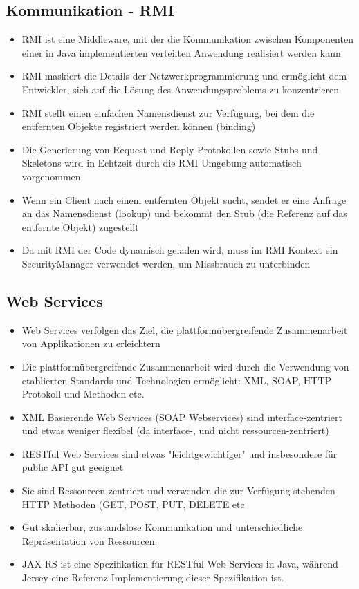 \documentclass[a4paper]{article}
\begin{document}
		\newpage
		\subsection{Kommunikation - RMI}
		
			\begin{itemize}
				\item RMI ist eine Middleware, mit der die Kommunikation zwischen Komponenten einer in Java implementierten verteilten Anwendung realisiert werden kann
				\item RMI maskiert die Details der Netzwerkprogrammierung und ermöglicht dem Entwickler, sich auf die Lösung des Anwendungsproblems zu konzentrieren
				\item RMI stellt einen einfachen Namensdienst zur Verfügung, bei dem die entfernten Objekte registriert werden können (binding)
				\item Die Generierung von Request und Reply Protokollen sowie Stubs und Skeletons wird in Echtzeit durch die RMI Umgebung automatisch vorgenommen
				\item Wenn ein Client nach einem entfernten Objekt sucht, sendet er eine Anfrage an das Namensdienst (lookup) und bekommt den Stub (die Referenz auf das entfernte Objekt) zugestellt
				\item Da mit RMI der Code dynamisch geladen wird, muss im RMI Kontext ein SecurityManager verwendet werden, um Missbrauch zu unterbinden
			\end{itemize}
		
		\subsection{Web Services}
		
			\begin{itemize}
				\item Web Services verfolgen das Ziel, die plattformübergreifende Zusammenarbeit von Applikationen zu erleichtern
				\item Die plattformübergreifende Zusammenarbeit wird durch die Verwendung von etablierten Standards und Technologien ermöglicht: XML, SOAP, HTTP Protokoll und Methoden etc.
				\item XML Basierende Web Services (SOAP Webservices) sind interface-zentriert und etwas weniger flexibel (da interface-, und nicht ressourcen-zentriert)
				\item RESTful Web Services sind etwas "leichtgewichtiger" und insbesondere für public API gut geeignet
				\item Sie sind Ressourcen-zentriert und verwenden die zur Verfügung stehenden HTTP Methoden (GET, POST, PUT, DELETE etc
				\item Gut skalierbar, zustandslose Kommunikation und unterschiedliche Repräsentation von Ressourcen.
				\item JAX RS ist eine Spezifikation für RESTful Web Services in Java, während Jersey eine Referenz Implementierung dieser Spezifikation ist.
			\end{itemize}
		
	\newpage
		
	
		
		
\end{document}
